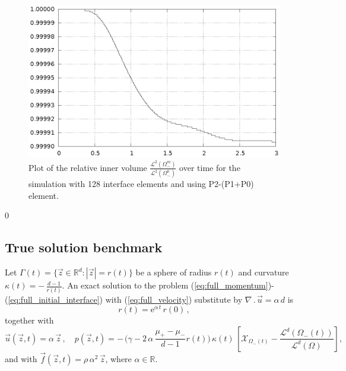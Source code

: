\documentclass[a4paper,12pt,onecolumn]{article}
\newcommand{\R}{{\mathbb R}}
\newcommand{\bigchi}{\ensuremath{\mathrm{\mathcal{X}}}}
\newcommand{\charfcn}[1]{\bigchi_{#1}} %
\begin{document}
\begin{figure}[htbp]
\centering
\includegraphics[width=.45\textwidth]
{figures/2d_benchmark1_inner_volume_p1p0_128.ps}
\caption{Plot of the relative inner volume
$\frac{\mathcal{L}^2(\Omega^m_-)}{\mathcal{L}^2(\Omega^0_-)}$ over time for the
simulation with 128 interface elements and using P2-(P1+P0) element.}
\label{fig:2d_benchmark1_volume}
\end{figure}

\setcounter{equation} 0
\subsection{True solution benchmark}

Let $\Gamma(t) = \{ \vec z \in \R^d : |\vec z| = r(t)\}$ be a sphere of radius
$r(t)$ and curvature $\kappa(t) = -\,\frac{d-1}{r(t)}$.
An exact solution to the problem
(\ref{eq:full_momentum})-(\ref{eq:full_initial_interface}) with
(\ref{eq:full_velocity}) substitute by $\nabla\,.\,\vec u = \alpha\,d$ is
\begin{equation} \label{eq:r_benchmark1}
r(t) = \mathrm{e}^{\alpha\,t}\,r(0)\,,
\end{equation}
together with
\begin{equation} \label{eq:up_benchmark1}
\vec u(\vec z, t) = \alpha\,\vec z \,, \quad
p(\vec z, t) = -\,\bigg(\gamma - 2\,\alpha\,\frac{\mu_+ - \mu_-}
{d-1}r(t)\bigg)\,\kappa(t)\,\left[ \charfcn{\Omega_-(t)} -
\frac{\mathcal{L}^d(\Omega_-(t))}{\mathcal{L}^d(\Omega)}\right],
\end{equation}
and with $\vec f(\vec z, t) = \rho\,\alpha^2\,\vec z$, where $\alpha \in \R$.
\end{document}
